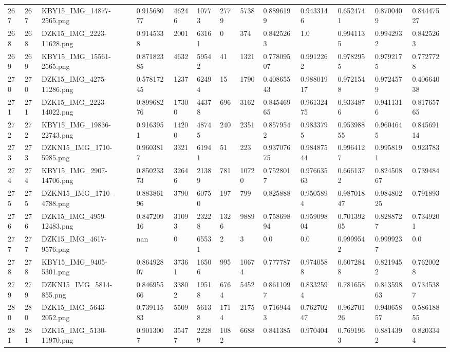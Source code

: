 \documentclass[11pt, a4paper, twoside]{report}
\begin{document}
\begin{longtable}[c]{@{}lllllllllllll@{}}
267 & 267 & KBY15\_IMG\_14877-2565.png & 0.91568077 & 46246 & 10773 & 2779 & 5738 & 0.8896199 & 0.9433146 & 0.6524741 & 0.8700409 & 0.84447527 \\
268 & 268 & DZK15\_IMG\_2223-11628.png & 0.9145338 & 2001 & 63161 & 0 & 374 & 0.8425263 & 1.0 & 0.9941135 & 0.9942932 & 0.8425263 \\
269 & 269 & KBY15\_IMG\_15561-2565.png & 0.87182385 & 4632 & 59542 & 41 & 1321 & 0.77809507 & 0.9912262 & 0.9782955 & 0.9792175 & 0.7727728 \\
270 & 270 & DZK15\_IMG\_4275-11286.png & 0.57817245 & 1237 & 62494 & 15 & 1790 & 0.40865543 & 0.98801917 & 0.9721548 & 0.9724579 & 0.40664038 \\
271 & 271 & DZK15\_IMG\_2223-14022.png & 0.89968276 & 17300 & 44378 & 696 & 3162 & 0.84546965 & 0.96132475 & 0.9334876 & 0.9411316 & 0.81765765 \\
272 & 272 & KBY15\_IMG\_19836-22743.png & 0.9163951 & 14200 & 48745 & 240 & 2351 & 0.8579542 & 0.9833795 & 0.95398855 & 0.9604645 & 0.84569114 \\
273 & 273 & DZKN15\_IMG\_1710-5985.png & 0.9603817 & 3321 & 61941 & 51 & 223 & 0.93707675 & 0.98487544 & 0.9964127 & 0.9958191 & 0.923783 \\
274 & 274 & KBY15\_IMG\_2907-14706.png & 0.85023373 & 32646 & 21389 & 781 & 10720 & 0.7528017 & 0.97663563 & 0.6661372 & 0.82450867 & 0.739484 \\
275 & 275 & DZKN15\_IMG\_1710-4788.png & 0.88386196 & 3790 & 60750 & 197 & 799 & 0.825888 & 0.9505894 & 0.98701847 & 0.98480225 & 0.791893 \\
276 & 276 & DZK15\_IMG\_4959-12483.png & 0.84720916 & 31093 & 23228 & 1326 & 9889 & 0.75869894 & 0.95909804 & 0.70139205 & 0.8288727 & 0.7349201 \\
277 & 277 & DZK15\_IMG\_4617-9576.png & nan & 0 & 65531 & 2 & 3 & 0.0 & 0.0 & 0.9999542 & 0.9999237 & 0.0 \\
278 & 278 & KBY15\_IMG\_9405-5301.png & 0.86492807 & 37361 & 16506 & 995 & 10674 & 0.777787 & 0.9740588 & 0.6072848 & 0.8219452 & 0.7620028 \\
279 & 279 & DZKN15\_IMG\_5814-855.png & 0.84695566 & 33802 & 19518 & 6764 & 5452 & 0.8611097 & 0.8332594 & 0.781658 & 0.81359863 & 0.7345387 \\
280 & 280 & DZK15\_IMG\_5643-2052.png & 0.73911583 & 5509 & 56138 & 1714 & 2175 & 0.7169443 & 0.76270247 & 0.96270126 & 0.94065857 & 0.58618855 \\
281 & 281 & DZK15\_IMG\_5130-11970.png & 0.9013007 & 35477 & 22289 & 1082 & 6688 & 0.841385 & 0.970404 & 0.7691963 & 0.8814392 & 0.8203344 \\

\end{longtable}
\end{document}
